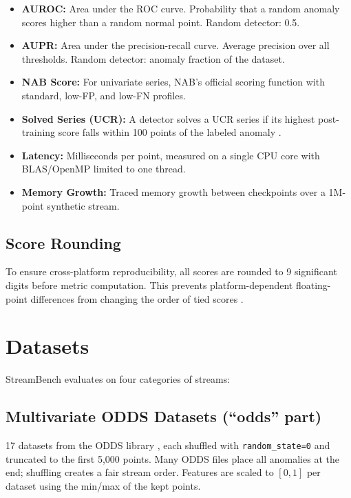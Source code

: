 \documentclass[11pt,a4paper]{article}
\begin{document}
\begin{itemize}
    \item \textbf{AUROC:} Area under the ROC curve. Probability that a random anomaly scores higher than a random normal point. Random detector: 0.5.
    \item \textbf{AUPR:} Area under the precision-recall curve. Average precision over all thresholds. Random detector: anomaly fraction of the dataset.
    \item \textbf{NAB Score:} For univariate series, NAB's official scoring function \citep{ahmad2017unsupervised} with standard, low-FP, and low-FN profiles.
    \item \textbf{Solved Series (UCR):} A detector solves a UCR series if its highest post-training score falls within 100 points of the labeled anomaly \citep{wu2021current}.
    \item \textbf{Latency:} Milliseconds per point, measured on a single CPU core with BLAS/OpenMP limited to one thread.
    \item \textbf{Memory Growth:} Traced memory growth between checkpoints over a 1M-point synthetic stream.
\end{itemize}

\subsection{Score Rounding}
\label{sec:rounding}

To ensure cross-platform reproducibility, all scores are rounded to 9 significant digits before metric computation. This prevents platform-dependent floating-point differences from changing the order of tied scores \citep{pysad_rounding}.

\section{Datasets}
\label{sec:datasets}

StreamBench evaluates on four categories of streams:

\subsection{Multivariate ODDS Datasets (``odds'' part)}
\label{sec:odds}

17 datasets from the ODDS library \citep{rayana2016odds}, each shuffled with \texttt{random\_state=0} and truncated to the first 5,000 points. Many ODDS files place all anomalies at the end; shuffling creates a fair stream order. Features are scaled to $[0,1]$ per dataset using the min/max of the kept points.
\end{document}
